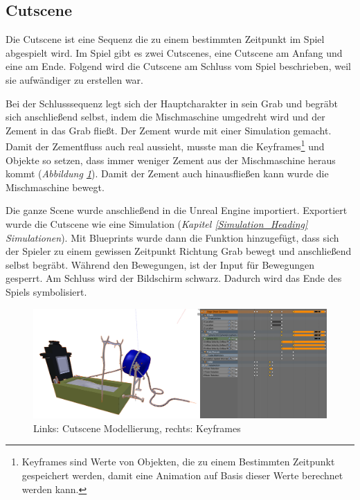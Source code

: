 \subsection{Cutscene}

Die Cutscene ist eine Sequenz die zu einem bestimmten Zeitpunkt im Spiel abgespielt wird.
Im Spiel gibt es zwei Cutscenes, eine Cutscene am Anfang und eine am Ende. Folgend wird die Cutscene
am Schluss vom Spiel beschrieben, weil sie aufwändiger zu erstellen war.

Bei der Schlusssequenz legt sich der Hauptcharakter in sein Grab und begräbt sich anschließend selbst, indem
die Mischmaschine umgedreht wird und der Zement in das Grab fließt. Der Zement wurde mit einer Simulation gemacht.
Damit der Zementfluss auch real aussieht, musste man die Keyframes\footnote{Keyframes sind Werte von Objekten, die zu einem Bestimmten Zeitpunkt gespeichert werden, damit eine Animation auf Basis dieser Werte berechnet werden kann.}
und Objekte so setzen, dass immer weniger Zement aus der Mischmaschine heraus kommt (\textit{Abbildung \ref{cutscene:image_modellierung}}). Damit der Zement auch hinausfließen kann wurde die Mischmaschine bewegt.

Die ganze Scene wurde anschließend in die Unreal Engine importiert. Exportiert wurde die Cutscene wie eine Simulation (\textit{Kapitel \ref{Simulation_Heading} \dq Simulationen\dq}).
Mit Blueprints wurde dann die Funktion hinzugefügt, dass sich der
Spieler zu einem gewissen Zeitpunkt Richtung Grab bewegt und anschließend selbst begräbt. Während den Bewegungen, ist der Input für Bewegungen gesperrt.
Am Schluss wird der Bildschirm schwarz. Dadurch wird das Ende des Spiels symbolisiert.

\begin{figure}[h]
    \centering
    \includegraphics[width=.8\textwidth]{images/Cutscene_Modellierung.png}
    \caption{Links: Cutscene Modellierung, rechts: Keyframes}
    \label{cutscene:image_modellierung}
\end{figure}
